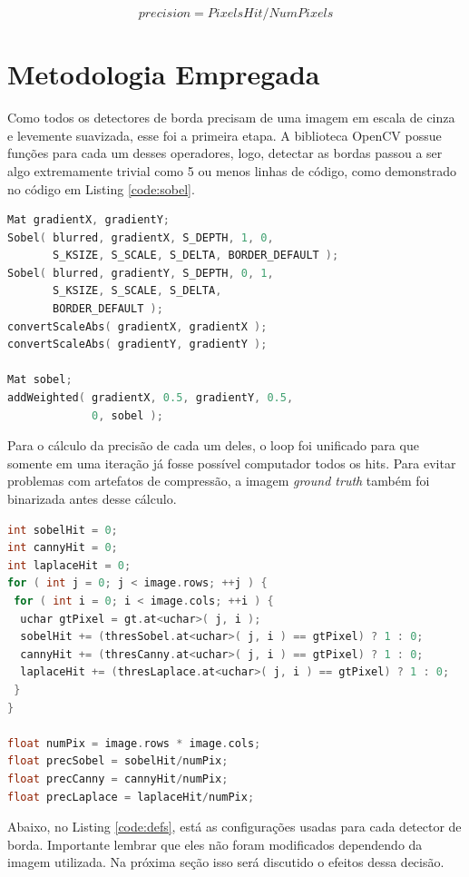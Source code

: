 \documentclass[10pt,twocolumn,letterpaper]{article}
\begin{document}
\begin{equation}
precision = PixelsHit/NumPixels
\label{eq:score}
\end{equation}

\section{Metodologia Empregada}
Como todos os detectores de borda precisam de uma imagem em escala de cinza e levemente suavizada, esse foi a primeira etapa. A biblioteca OpenCV possue funções para cada um desses operadores, logo, detectar as bordas passou a ser algo extremamente trivial como 5 ou menos linhas de código, como demonstrado no código em Listing \ref{code:sobel}.

\begin{lstlisting}[language=C++, caption={Obtenção das bordas por Sobel. Esse foi o maior procedimento dos três.}, label={code:sobel}]
Mat gradientX, gradientY;
Sobel( blurred, gradientX, S_DEPTH, 1, 0,
       S_KSIZE, S_SCALE, S_DELTA, BORDER_DEFAULT );
Sobel( blurred, gradientY, S_DEPTH, 0, 1,
       S_KSIZE, S_SCALE, S_DELTA,
       BORDER_DEFAULT );
convertScaleAbs( gradientX, gradientX );
convertScaleAbs( gradientY, gradientY );

Mat sobel;
addWeighted( gradientX, 0.5, gradientY, 0.5,
             0, sobel );
\end{lstlisting}

Para o cálculo da precisão de cada um deles, o loop foi unificado para que somente em uma iteração já fosse possível computador todos os hits. Para evitar problemas com artefatos de compressão, a imagem \emph{ground truth} também foi binarizada antes desse cálculo.

\begin{lstlisting}[language=C++, caption={Obtendo precisão dos detectores}, label={code:calcprec}]
int sobelHit = 0;
int cannyHit = 0;
int laplaceHit = 0;
for ( int j = 0; j < image.rows; ++j ) {
 for ( int i = 0; i < image.cols; ++i ) {
  uchar gtPixel = gt.at<uchar>( j, i );
  sobelHit += (thresSobel.at<uchar>( j, i ) == gtPixel) ? 1 : 0;
  cannyHit += (thresCanny.at<uchar>( j, i ) == gtPixel) ? 1 : 0;
  laplaceHit += (thresLaplace.at<uchar>( j, i ) == gtPixel) ? 1 : 0;
 }
}

float numPix = image.rows * image.cols;
float precSobel = sobelHit/numPix;
float precCanny = cannyHit/numPix;
float precLaplace = laplaceHit/numPix;
\end{lstlisting}

Abaixo, no Listing \ref{code:defs}, está as configurações usadas para cada detector de borda. Importante lembrar que eles não foram modificados dependendo da imagem utilizada. Na próxima seção isso será discutido o efeitos dessa decisão.
\end{document}
